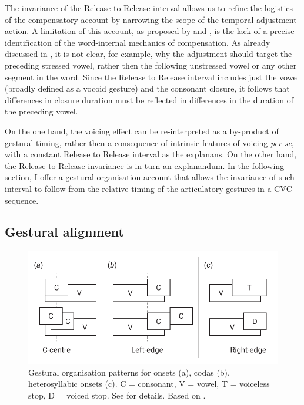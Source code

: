 \documentclass[preprint]{JASAnew}
\begin{document}
The invariance of the Release to Release interval allows us to refine
the logistics of the compensatory account by narrowing the scope of the
temporal adjustment action. A limitation of this account, as proposed by
\citet{slis1969} and \citet{lehiste1970}, is the lack of a precise
identification of the word-internal mechanics of compensation. As
already discussed in , it is not clear, for example, why
the adjustment should target the preceding stressed vowel, rather then
the following unstressed vowel or any other segment in the word. Since
the Release to Release interval includes just the vowel (broadly defined
as a vocoid gesture) and the consonant closure, it follows that
differences in closure duration must be reflected in differences in the
duration of the preceding vowel.

On the one hand, the voicing effect can be re-interpreted as a
by-product of gestural timing, rather then a consequence of intrinsic
features of voicing \emph{per se}, with a constant Release to Release
interval as the explanans. On the other hand, the Release to Release
invariance is in turn an explanandum. In the following section, I offer
a gestural organisation account that allows the invariance of such
interval to follow from the relative timing of the articulatory gestures
in a CV́C sequence.

\hypertarget{gestural-alignment}{%
\subsection{Gestural alignment}\label{gestural-alignment}}

\label{s:gestural}

\begin{figure}
  \centering
  \includegraphics[width=\linewidth]{img/gorganisation.pdf}
  \caption{Gestural organisation patterns for onsets (a), codas (b), heterosyllabic onsets (c). C = consonant, V = vowel, T = voiceless stop, D = voiced stop. See  for details. Based on \citet{marin2010}.}
  \label{f:gorganisation}
\end{figure}
\end{document}
